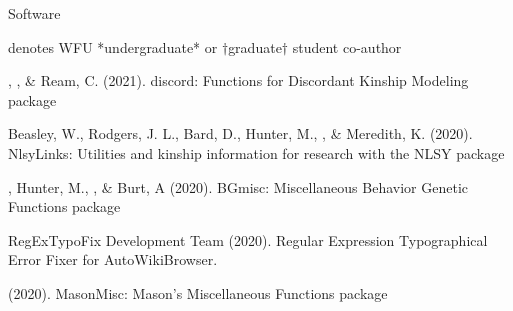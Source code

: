 \begin{rSection}{\textrm{Software}}%
\vspace{-1mm}\begin{center}\footnotesize{denotes WFU *undergraduate* or $\dagger$graduate$\dagger$ student co-author}\end{center}\vspace{-5mm}

\begin{etaremune}
\item\meb, \jt, \& Ream, C. (2021). discord: Functions for Discordant Kinship Modeling \R package 
%

%
%
\item  Beasley, W., Rodgers, J. L., Bard, D., Hunter, M., \meb, \& Meredith, K. (2020). NlsyLinks: Utilities and kinship information for research with the NLSY \R package \smallskip\\
%
%
\item\meb, Hunter, M., \jt, \& Burt, A (2020). BGmisc: Miscellaneous Behavior Genetic Functions \R package %

\item RegExTypoFix Development Team (2020). Regular Expression Typographical Error Fixer for Auto\allowbreak WikiBrowser. 
%
\item\meb (2020). MasonMisc: Mason's Miscellaneous Functions \R package 
%
%
\end{etaremune}
\end{rSection}
